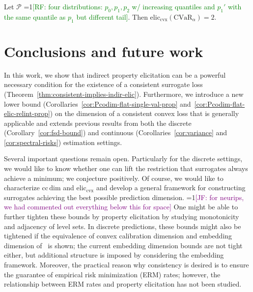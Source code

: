 \documentclass[anon,12pt]{colt2021} %
\newcommand{\Comments}{1}
\newcommand{\mynote}[2]{\ifnum\Comments=1\textcolor{#1}{#2}\fi}
\newcommand{\raf}[1]{\mynote{green}{[RF: #1]}}
\newcommand{\jessie}[1]{\mynote{purple}{[JF: #1]}}
\newcommand{\reals}{\mathbb{R}}
\newcommand{\eliccvx}{\mathrm{elic}_\mathrm{cvx}}
\newcommand{\ccdim}{\mathrm{cc\,dim}}
\renewcommand{\P}{\mathcal{P}}
\newcommand{\Y}{\mathcal{Y}}
\newcommand{\CVaR}{\mathrm{CVaR}}
\begin{document}
\begin{corollary}
  \label{cor:spectral-risks}
  Let $\P$ \raf{four distributions: $p_0,p_1,p_2$ w/ increasing quantiles and $p_1'$ with the same quantile as $p_1$ but different tail}.
  Then $\eliccvx(\CVaR_\alpha) = 2$.
\end{corollary}


\section{Conclusions and future work}\label{sec:conclusions}
In this work, we show that indirect property elicitation can be a powerful necessary condition for the existence of a consistent surrogate loss (Theorem~\ref{thm:consistent-implies-indir-elic}).
Furthermore, we introduce a new lower bound (Corollaries~\ref{cor:Pcodim-flat-single-val-prop} and~\ref{cor:Pcodim-flat-elic-relint-prop}) on the dimension of a consistent convex loss that is generally applicable and extends previous results from both the discrete (Corollary~\ref{cor:fsd-bound}) and continuous (Corollaries~\ref{cor:variance} and \ref{cor:spectral-risks}) estimation settings.

Several important questions remain open.
Particularly for the discrete settings, we would like to know whether one can lift the restriction that surrogates always achieve a minimum; we conjecture positively.
Of course, we would like to characterize $\ccdim$ and $\eliccvx$ and develop a general framework for constructing surrogates achieving the best possible prediction dimension.
\jessie{for neurips, we had commented out everything below this for space}
One might be able to further tighten these bounds by property elicitation by studying monotonicity and adjacency of level sets.
In discrete predictions, these bounds might also be tightened if the equivalence of convex calibration dimension and embedding dimension of~\citet{finocchiaro2020embedding} is shown; the current embedding dimension bounds are not tight either, but additional structure is imposed by considering the embedding framework.
Moreover, the practical reason why consistency is desired is to ensure the guarantee of empirical risk minimization (ERM) rates; however, the relationship between ERM rates and property elicitation has not been studied.
\end{document}
